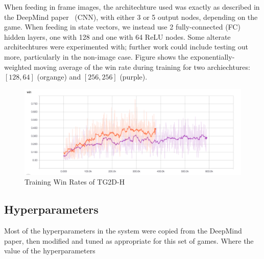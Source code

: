 \documentclass[12pt]{article}
\begin{document}
When feeding in frame images, the architechture used was exactly as described in the DeepMind paper~\cite{deepmind} (CNN), with either 3 or 5 output nodes, depending on the game. When feeding in state vectors, we instead use 2 fully-connected (FC) hidden layers, one with 128 and one with 64 ReLU nodes. Some alterate architechtures were experimented with; further work could include testing out more, particularly in the non-image case. Figure \label{fig:trainingwinrate} shows the exponentially-weighted moving average of the win rate during training for two archiechtures: $[128, 64]$ (organge) and $[256, 256]$ (purple).

\begin{figure}[H]
  \includegraphics[height=1\textwidth]{report/TG2D-H_training_winrate}
  \centering
  \caption{Training Win Rates of TG2D-H}
  \label{fig:trainingwinrate}
\end{figure}

\subsection{Hyperparameters}

Most of the hyperparameters in the system were copied from the DeepMind paper, then modified and tuned as appropriate for this set of games. Where the value of the hyperparameters
\end{document}
